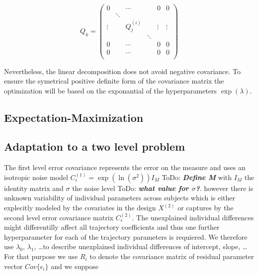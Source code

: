 \documentclass[final, paper=letter,5p,times,twocolumn]{elsarticle}
\newcommand{\ToDo}[1]{ToDo: \textbf{\textit{#1}}}
\theoremstyle{definition}
\begin{document}
\begin{equation}
  Q_{k} =
  \left (
  \begin{array}{cccccc}
    0 &  &\cdots&& 0 & 0 \\
      & \ddots &  &&  &  \\
    \vdots &  & Q_{j}^{(i)} && \vdots & \vdots \\
      &        &  &\ddots&  &  \\
    0 &  &\cdots&& 0 & 0 \\
    0 &  &\cdots&& 0 & 0 \\
  \end{array}
    \right )
  \label{Covariance_base_matrix}
\end{equation}

Nevertheless, the linear decomposition does not avoid negative covariance. To ensure the symetrical positive definite form of the covariance matrix the optimization will be based on the exponantial of the hyperparameters $\exp(\lambda)$.

\subsection{Expectation-Maximization}

\subsection{Adaptation to a two level problem}

The first level error covariance represents the error on the measure and uses an isotropic noise model $C_{\epsilon}^{(1)} = \exp(\ln(\sigma^{2}))I_{M}$ \ToDo{Define M} with $I_{M}$ the identity matrix and $\sigma$ the noise level \ToDo{what value for $\sigma$?}. however there is unknown variability of individual parameters across subjects which is either explecitly modeled by the covariates in the design $X^{(2)}$ or captures by the second level error covariance matrix $C_{\epsilon}^{(2)}$. The unexplained individual differences might differentilly affect all trajectory coefficients and thus one further hyperparameter for each of the trajectory parameters is requiered. We therefore use $\lambda_{0}$, $\lambda_{1}$, \dots to describe unexplained individual differences of intercept, slope, \dots For that purpose we use $R_{i}$ to denote the covariance matrix of residual parameter vector $Cov\{\epsilon_{i}\}$ and we suppose
\end{document}
